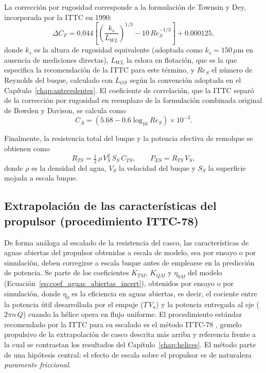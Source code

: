 La corrección por rugosidad corresponde a la formulación de Townsin y Dey,
incorporada por la ITTC en 1990:
%
\begin{equation}\label{eq:dCF}
    \Delta C_F = 0.044\left[\left(\frac{k_s}{L_{WL}}\right)^{1/3}
                 - 10\,Re_S^{-1/3}\right] + 0.000125 ,
\end{equation}
%
donde $k_s$ es la altura de rugosidad equivalente (adoptada como
$k_s = 150\,\mu\text{m}$ en ausencia de mediciones directas), $L_{WL}$ la eslora
en flotación, que es la que especifica la recomendación de la ITTC para este
término, y $Re_S$ el número de Reynolds del buque, calculado con $L_{OS}$ según
la convención adoptada en el Capítulo~\ref{chap:antecedentes}. El coeficiente de
correlación, que la ITTC separó de la corrección por rugosidad en reemplazo de la
formulación combinada original de Bowden y Davison, se calcula como
%
\begin{equation}\label{eq:CA}
    C_A = \left(5.68 - 0.6\log_{10} Re_S\right)\times 10^{-3} .
\end{equation}

Finalmente, la resistencia total del buque y la potencia efectiva de remolque se obtienen como
%
\begin{equation}
    R_{TS} = \tfrac{1}{2}\,\rho\,V_S^2\,S_S\,C_{TS}, \qquad P_{ES} = R_{TS}\,V_S,
\end{equation}
%
donde $\rho$ es la densidad del agua, $V_S$ la velocidad del buque y $S_S$ la superficie mojada a escala buque.

\subsection{Extrapolación de las características del propulsor (procedimiento ITTC-78)}
\label{sec:ittc78_helices_metodo}

De forma análoga al escalado de la resistencia del casco, las características de
aguas abiertas del propulsor obtenidas a escala de modelo, sea por ensayo o por
simulación, deben corregirse a escala buque antes de emplearse en la predicción de
potencia. Se parte de los coeficientes $K_{TM}$, $K_{QM}$ y $\eta_{0M}$ del modelo (Ecuación~\eqref{eq:coef_aguas_abiertas_incert}), obtenidos por ensayo o por simulación, donde $\eta_0$ es la eficiencia en aguas abiertas, es decir, el cociente entre la
potencia útil desarrollada por el empuje ($T\,V_a$) y la potencia entregada al eje
($2\pi n\,Q$) cuando la hélice opera en flujo uniforme. El procedimiento estándar recomendado por la ITTC para su escalado es el método
ITTC-78 \citep{ITTC_Performance_prediction}, gemelo propulsivo de la extrapolación de
casco descrita más arriba y referencia frente a la cual se contrastan los resultados
del Capítulo~\ref{chap:helices}. El método parte de una hipótesis central: el efecto de
escala sobre el propulsor es de naturaleza \emph{puramente friccional}.

